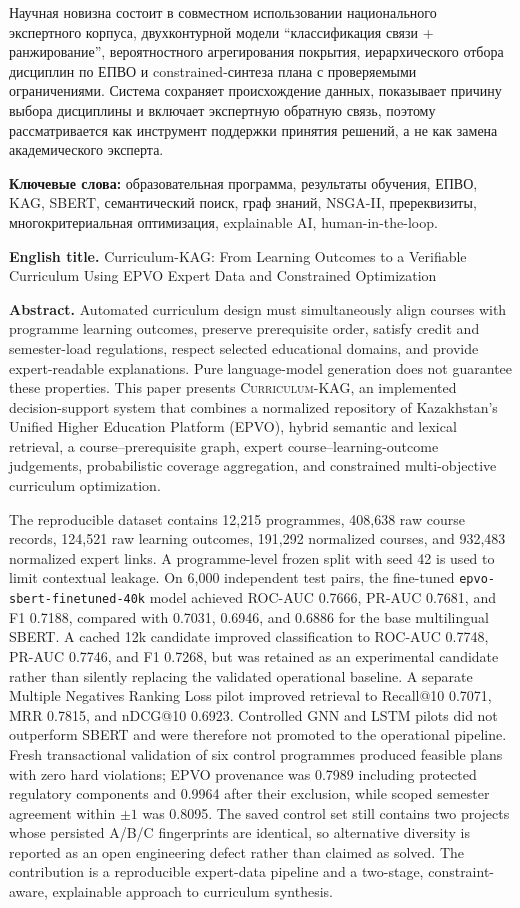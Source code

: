 \documentclass[twoside,11pt]{article}
\newcommand{\systemname}{\textsc{Curriculum-KAG}}
\begin{document}
Научная новизна состоит в совместном использовании национального экспертного корпуса, двухконтурной модели ``классификация связи + ранжирование'', вероятностного агрегирования покрытия, иерархического отбора дисциплин по ЕПВО и constrained-синтеза плана с проверяемыми ограничениями. Система сохраняет происхождение данных, показывает причину выбора дисциплины и включает экспертную обратную связь, поэтому рассматривается как инструмент поддержки принятия решений, а не как замена академического эксперта.

\medskip
\noindent\textbf{Ключевые слова:}
образовательная программа, результаты обучения, ЕПВО, KAG, SBERT, семантический поиск, граф знаний, NSGA-II, пререквизиты, многокритериальная оптимизация, explainable AI, human-in-the-loop.

\bigskip
\noindent\textbf{English title.}
Curriculum-KAG: From Learning Outcomes to a Verifiable Curriculum Using EPVO Expert Data and Constrained Optimization

\medskip
\noindent\textbf{Abstract.}
Automated curriculum design must simultaneously align courses with programme learning outcomes, preserve prerequisite order, satisfy credit and semester-load regulations, respect selected educational domains, and provide expert-readable explanations. Pure language-model generation does not guarantee these properties. This paper presents \systemname{}, an implemented decision-support system that combines a normalized repository of Kazakhstan's Unified Higher Education Platform (EPVO), hybrid semantic and lexical retrieval, a course--prerequisite graph, expert course--learning-outcome judgements, probabilistic coverage aggregation, and constrained multi-objective curriculum optimization.

The reproducible dataset contains 12,215 programmes, 408,638 raw course records, 124,521 raw learning outcomes, 191,292 normalized courses, and 932,483 normalized expert links. A programme-level frozen split with seed 42 is used to limit contextual leakage. On 6,000 independent test pairs, the fine-tuned \texttt{epvo-sbert-finetuned-40k} model achieved ROC-AUC 0.7666, PR-AUC 0.7681, and F1 0.7188, compared with 0.7031, 0.6946, and 0.6886 for the base multilingual SBERT. A cached 12k candidate improved classification to ROC-AUC 0.7748, PR-AUC 0.7746, and F1 0.7268, but was retained as an experimental candidate rather than silently replacing the validated operational baseline. A separate Multiple Negatives Ranking Loss pilot improved retrieval to Recall@10 0.7071, MRR 0.7815, and nDCG@10 0.6923. Controlled GNN and LSTM pilots did not outperform SBERT and were therefore not promoted to the operational pipeline. Fresh transactional validation of six control programmes produced feasible plans with zero hard violations; EPVO provenance was 0.7989 including protected regulatory components and 0.9964 after their exclusion, while scoped semester agreement within $\pm1$ was 0.8095. The saved control set still contains two projects whose persisted A/B/C fingerprints are identical, so alternative diversity is reported as an open engineering defect rather than claimed as solved. The contribution is a reproducible expert-data pipeline and a two-stage, constraint-aware, explainable approach to curriculum synthesis.
\end{document}
